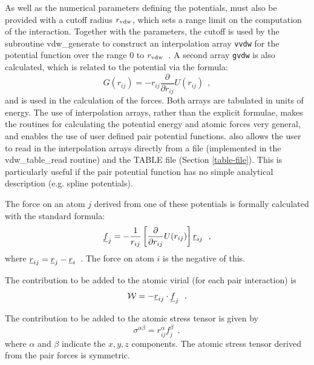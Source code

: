 As well as the numerical parameters defining the potentials, \D
must also be provided with a cutoff radius $r_{\rm vdw}$, which sets a
range limit on the computation of the interaction.  Together with
the parameters, the cutoff is used by the subroutine {\sc
vdw\_generate} to construct an interpolation array {\tt vvdw} for
the potential function over the range 0 to $r_{\rm vdw}$~.  A second
array {\tt gvdw} is also calculated, which is related to the
potential via the formula:
\begin{equation}
G(r_{ij}) = -r_{ij}\frac{\partial}{\partial r_{ij}}U(r_{ij})~~,
\end{equation}
and is used in the calculation of the forces.  Both arrays are
tabulated in units of energy.  The use of interpolation arrays,
rather than the explicit formulae, makes the routines for
calculating the potential energy and atomic forces very general, and
enables the use of user defined pair potential functions.  \D also
allows the user to read in the interpolation arrays directly from a
file (implemented in the {\sc vdw\_table\_read} routine) and the
TABLE file (Section \ref{table-file}). This is particularly useful
if the pair potential function has no simple analytical description
(e.g. spline potentials).

The force on an atom $j$ derived from one of these potentials is
formally calculated with the standard formula:
\begin{equation}
\mbox{$\underline{f}$}_{j} = -\frac{1}{r_{ij}}\left[\frac{\partial}{\partial
r_{ij}}U(r_{ij})\right]\mbox{$\underline{r}$}_{ij}~~,
\end{equation}
where $\mbox{$\underline{r}$}_{ij} = \mbox{$\underline{r}$}_{j}-\mbox{$\underline{r}$}_{i}$~.  The force on
atom $i$ is the negative of this.

The contribution to be added to the atomic virial (for each pair
interaction) is
\begin{equation}
{\cal W} = -\mbox{$\underline{r}$}_{ij} \cdot \mbox{$\underline{f}$}_{j}~~.
\end{equation}

The contribution to be added to the atomic stress tensor is
given by
\begin{equation}
\sigma^{\alpha \beta} = r_{ij}^{\alpha}f_{j}^{\beta}~~,
\end{equation}
where $\alpha$ and $\beta$ indicate the $x,y,z$ components.  The
atomic stress tensor derived from the pair
forces is symmetric.

